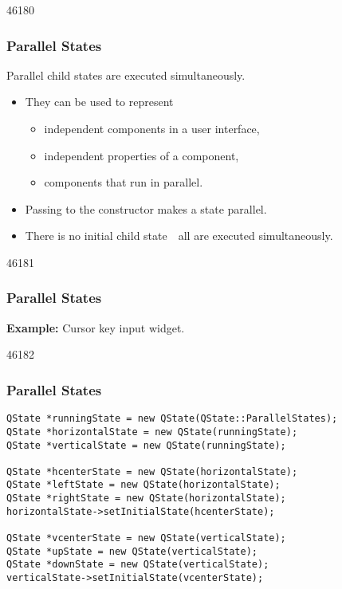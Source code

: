 \begin{slide}{46180}\frametitle{Parallel States}
\label{Animation-States-Parallel}
\vspace*{1.5em}
Parallel child states are executed simultaneously.

\begin{itemize}
\item They can be used to represent
\begin{itemize}
\item independent components in a user interface,
\item independent properties of a component,
\item components that run in parallel.
\end{itemize}
\item Passing  to the 
constructor makes a state parallel.
\item There is no initial child state~\textendash~all are executed
simultaneously.
\end{itemize}
\end{slide}

\begin{slide}{46181}\frametitle{Parallel States}
\textbf{Example:} Cursor key input widget.

\vspace*{0.5em}

\end{slide}

\begin{slide}[fragile]{46182}\frametitle{Parallel States}

\vspace*{-0.5em}
\small
\begin{lstlisting}
QState *runningState = new QState(QState::ParallelStates);
QState *horizontalState = new QState(runningState);
QState *verticalState = new QState(runningState);

QState *hcenterState = new QState(horizontalState);
QState *leftState = new QState(horizontalState);
QState *rightState = new QState(horizontalState);
horizontalState->setInitialState(hcenterState);

QState *vcenterState = new QState(verticalState);
QState *upState = new QState(verticalState);
QState *downState = new QState(verticalState);
verticalState->setInitialState(vcenterState);
\end{lstlisting}
\normalsize
{}
\vfill
\end{slide}

